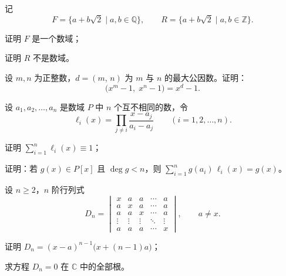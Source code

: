 \documentclass[11pt,a4paper,fontset=windows]{ctexart}
\begin{document}
\begin{qs}[resume*]
\item 记
\[
F=\{a+b\sqrt{2}\mid a,b\in\mathbb{Q}\},\qquad R=\{a+b\sqrt{2}\mid a,b\in\mathbb{Z}\}.
\]
\begin{sub}
\item 证明 $F$ 是一个数域；
\item 证明 $R$ 不是数域。
\end{sub}

\item 设 $m,n$ 为正整数，$d=(m,\,n)$ 为 $m$ 与 $n$ 的最大公因数。证明：
\[
\bigl(x^{m}-1,\;x^{n}-1\bigr)=x^{d}-1 .
\]

\item 设 $a_1,a_2,\ldots,a_n$ 是数域 $P$ 中 $n$ 个互不相同的数，令
\[
\ell_i(x)=\prod_{j\neq i}\frac{x-a_j}{a_i-a_j}\qquad (i=1,2,\ldots,n).
\]
\begin{sub}
\item 证明 $\displaystyle\sum_{i=1}^{n}\ell_i(x)\equiv 1$；
\item 证明：若 $g(x)\in P[x]$ 且 $\deg g<n$，则 $\displaystyle\sum_{i=1}^{n}g(a_i)\,\ell_i(x)=g(x)$。
\end{sub}

\item 设 $n\ge 2$，$n$ 阶行列式
\[
D_n=\begin{vmatrix}
x & a & a & \cdots & a\\
a & x & a & \cdots & a\\
a & a & x & \cdots & a\\
\vdots & \vdots & \vdots & \ddots & \vdots\\
a & a & a & \cdots & x
\end{vmatrix},\qquad a\neq x .
\]
\begin{sub}
\item 证明 $D_n=(x-a)^{n-1}\bigl(x+(n-1)a\bigr)$；
\item 求方程 $D_n=0$ 在 $\mathbb{C}$ 中的全部根。
\end{sub}
\end{qs}
\end{document}
